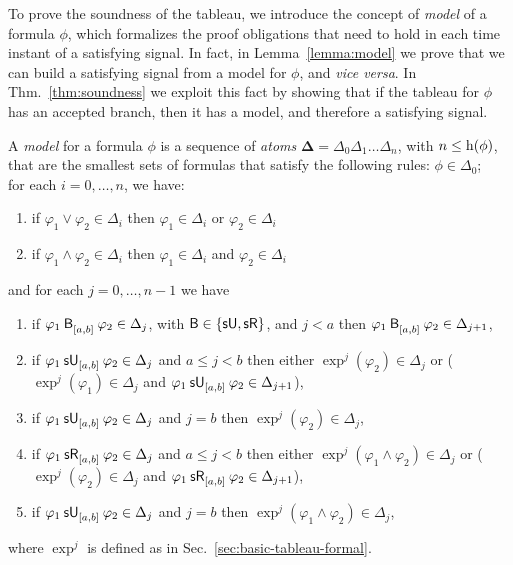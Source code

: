 \documentclass[acmsmall,screen]{acmart}
\begin{document}
To prove the soundness of the tableau, we introduce the concept of \emph{model} of a formula $\phi$, which formalizes the proof obligations that need to hold in each time instant of a satisfying signal.
In fact, in Lemma~\ref{lemma:model} we prove that we can build a satisfying signal from a model for $\phi$, and \emph{vice versa}.
In Thm.~\ref{thm:soundness} we exploit this fact by showing that if the tableau for $\phi$ has an accepted branch,
then it has a model, and therefore a satisfying signal.
\begin{definition}
\label{def:model}
A \emph{model} for a formula $\phi$ is a sequence of \emph{atoms}
$\mathbf{\Delta} = \Delta_0 \Delta_1 \dots \Delta_n$,
with $n \leq \horiz(\phi)$, that are the smallest sets of formulas that satisfy the following rules:
$\phi \in \Delta_0$;\\
for each $i = 0, \dots, n$, we have:
\begin{enumerate}
\item \label{item:model-or}
    if $\varphi_1 \lor \varphi_2 \in \Delta_i$ then $\varphi_1 \in \Delta_i$ or $\varphi_2 \in \Delta_i$
\item \label{item:model-and}
    if $\varphi_1 \land \varphi_2 \in \Delta_i$ then $\varphi_1 \in \Delta_i$ and $\varphi_2 \in \Delta_i$
\end{enumerate}
and for each $j = 0, \dots, n-1$ we have
\begin{enumerate}[resume]
\item \label{item:model-temp-lta}
    if $\anybinop{[a,b]}{\varphi_1}{\varphi_2} \in \Delta_j$,
    with $\mathsf{B} \in \set{\suntilop, \sreleaseop}$, and $j < a$ then
    $\anybinop{[a,b]}{\varphi_1}{\varphi_2} \in \Delta_{j+1}$,
\item \label{item:model-suntil-atb}
    if $\suntil{[a,b]}{\varphi_1}{\varphi_2} \in \Delta_j$ and $a \leq j < b$ then either
    $\exp^j(\varphi_2) \in \Delta_j$ or
    ($\exp^j(\varphi_1) \in \Delta_j$ and $\suntil{[a,b]}{\varphi_1}{\varphi_2} \in \Delta_{j+1}$),
\item \label{item:model-suntil-eqb}
    if $\suntil{[a,b]}{\varphi_1}{\varphi_2} \in \Delta_j$ and $j = b$ then
    $\exp^j(\varphi_2) \in \Delta_j$,
\item \label{item:model-srelease-atb}
    if $\srelease{[a,b]}{\varphi_1}{\varphi_2} \in \Delta_j$ and $a \leq j < b$ then either
    $\exp^j(\varphi_1 \land \varphi_2) \in \Delta_j$ or
    ($\exp^j(\varphi_2) \in \Delta_j$ and $\srelease{[a,b]}{\varphi_1}{\varphi_2} \in \Delta_{j+1}$),
\item \label{item:model-srelease-eqb}
    if $\suntil{[a,b]}{\varphi_1}{\varphi_2} \in \Delta_j$ and $j = b$ then
    $\exp^j(\varphi_1 \land \varphi_2) \in \Delta_j$,
\end{enumerate}
where $\exp^j$ is defined as in Sec.~\ref{sec:basic-tableau-formal}.
\end{definition}
\end{document}
